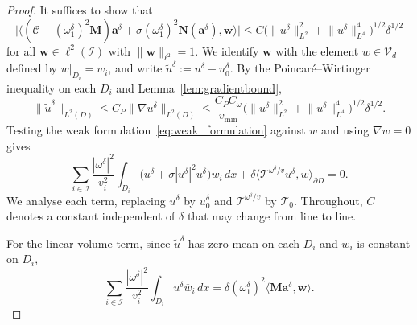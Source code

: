 \documentclass[a4paper,reqno,twoside]{amsart}
\numberwithin{equation}{section}
\theoremstyle{definition}
\renewcommand{\tilde}{\widetilde}
\newcommand{\<}{\ensuremath \leq}
\renewcommand{\>}{\ensuremath \geq}
\renewcommand{\tilde}{\widetilde}
\begin{document}
\begin{proof}
    It suffices to show that
    \begin{equation}\label{eq:approx_dual}
        \bigl\lvert \bigl\langle
          (\mathcal{C} - (\omega_1^\delta)^2 \mathbf{M}) \mathbf{a}^\delta
          + \sigma (\omega_1^\delta)^2 \mathbf{N}(\mathbf{a}^\delta),
          \mathbf{w}
        \bigr\rangle \bigr\rvert
        \leq C
        \bigl( \lVert u^\delta \rVert_{L^2}^2
          + \lVert u^\delta \rVert_{L^4}^4 \bigr)^{1/2}
        \delta^{1/2}
    \end{equation}
    for all $\mathbf{w} \in \ell^2(\mathcal{I})$ with
    $\lVert \mathbf{w} \rVert_{\ell^2} = 1$. We identify $\mathbf{w}$
    with the element $w \in \mathcal{V}_d$ defined by $w|_{D_i} = w_i$,
    and write $\tilde{u}^\delta := u^\delta - u_0^\delta$. By the
    Poincar\'e--Wirtinger inequality on each $D_i$ and
    Lemma~\ref{lem:gradientbound},
    \begin{equation}\label{eq:tilde_bound}
        \lVert \tilde{u}^\delta \rVert_{L^2(D)}
        \leq C_P \lVert \nabla u^\delta \rVert_{L^2(D)}
        \leq \frac{C_P C_\omega}{v_{\min}}
        \bigl( \lVert u^\delta \rVert_{L^2}^2
          + \lVert u^\delta \rVert_{L^4}^4 \bigr)^{1/2}
        \delta^{1/2}.
    \end{equation}
    Testing the weak formulation~\eqref{eq:weak_formulation} against $w$
    and using $\nabla w = 0$ gives
    \begin{equation}\label{eq:tested_weak}
        \sum_{i \in \mathcal{I}} \frac{|\omega^\delta|^2}{v_i^2}
        \int_{D_i}
        \bigl( u^\delta + \sigma |u^\delta|^2 u^\delta \bigr)
        \overline{w}_i \, dx
        + \delta \langle \mathcal{T}^{\omega^\delta/v} u^\delta,
          w \rangle_{\partial D} = 0.
    \end{equation}
    We analyse each term, replacing $u^\delta$ by $u_0^\delta$ and
    $\mathcal{T}^{\omega^\delta/v}$ by $\mathcal{T}_0$. Throughout, $C$
    denotes a constant independent of $\delta$ that may change from
    line to line.

    For the linear volume term, since $\tilde{u}^\delta$ has zero mean
    on each $D_i$ and $w_i$ is constant on $D_i$,
    \begin{equation}
        \sum_{i \in \mathcal{I}} \frac{|\omega^\delta|^2}{v_i^2}
        \int_{D_i} u^\delta \overline{w}_i \, dx
        = \delta(\omega_1^\delta)^2
          \langle \mathbf{M} \mathbf{a}^\delta, \mathbf{w} \rangle.
    \end{equation}


\end{proof}
\end{document}
